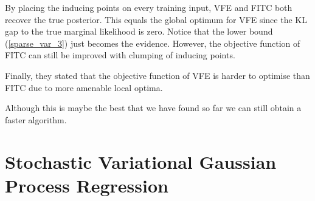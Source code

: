 \documentclass[12pt,a4paper,oneside]{book}
\begin{document}
By placing the inducing points on every training input, VFE and FITC both recover the true posterior. This equals the global optimum for VFE since the KL gap to the true marginal likelihood is zero.  Notice that the lower bound (\ref{sparse_var_3}) just becomes the evidence. However, the objective function of FITC can still be improved with clumping of inducing points. 

Finally, they stated that the objective function of VFE is harder to optimise than FITC due to more amenable local optima. 

Although this is maybe the best that we have found so far we can still obtain a faster algorithm. 

\section{Stochastic Variational Gaussian Process Regression}
\end{document}
